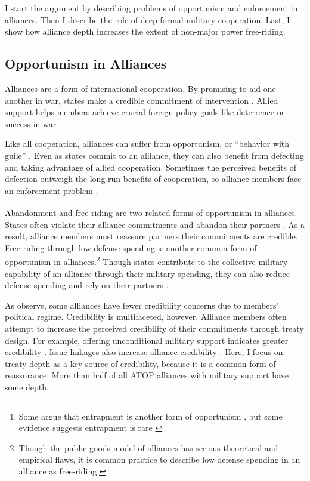 \documentclass[12pt]{article}
\begin{document}
I start the argument by describing problems of opportunism and enforcement in alliances. 
Then I describe the role of deep formal military cooperation. 
Last, I show how alliance depth increases the extent of non-major power free-riding. 


\subsection{Opportunism in Alliances}

Alliances are a form of international cooperation. 
By promising to aid one another in war, states make a credible commitment of intervention \citep{Fearon1997, Morrow2000}. 
Allied support helps members achieve crucial foreign policy goals like deterrence or success in war \citep{Walt1990, Snyder1997}. 


Like all cooperation, alliances can suffer from opportunism, or ``behavior with guile'' \citep{Williamson1985}. 
Even as states commit to an alliance, they can also benefit from defecting and taking advantage of allied cooperation. 
Sometimes the perceived benefits of defection outweigh the long-run benefits of cooperation, so alliance members face an enforcement problem \citep{Fearon1998a, Koremenosetal2001}.


Abandonment and free-riding are two related forms of opportunism in alliances.\footnote{Some argue that entrapment is another form of opportunism \citep{Snyder1984}, but some evidence suggests entrapment is rare \citep{Kim2011, Beckley2015}}
States often violate their alliance commitments and abandon their partners \citep{BerkemeierFuhrmann2018}.
As a result, alliance members must reassure partners their commitments are credible. 
Free-riding through low defense spending is another common form of opportunism in alliances.\footnote{Though the public goods model of alliances has serious theoretical and empirical flaws, it is common practice to describe low defense spending in an alliance as free-riding.}
Though states contribute to the collective military capability of an alliance through their military spending, they can also reduce defense spending and rely on their partners \citep{OlsonZeckhauser1966, Morrow1993, Conybeare1994, SandlerHartley2001}.


As \citet{DigiuseppePoast2016} observe, some alliances have fewer credibility concerns due to members' political regime. 
Credibility is multifaceted, however. 
Alliance members often attempt to increase the perceived credibility of their commitments through treaty design. 
For example, offering unconditional military support indicates greater credibility \citep{Benson2012, Chibaetal2015}. 
Issue linkages also increase alliance credibility \citep{LongLeeds2006, Poast2012, Poast2013}. 
Here, I focus on treaty depth as a key source of credibility, because it is a common form of reassurance. 
More than half of all ATOP alliances with military support have some depth. 
\end{document}

